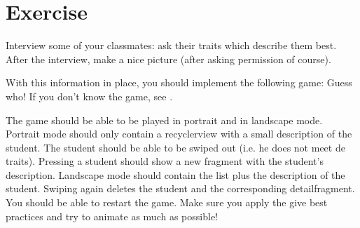 \section{Exercise}
\begin{exercise}
	Interview some of your classmates: ask their traits which describe them best. After the interview, make a nice picture (after asking permission of course).
	
	With this information in place, you should implement the following game: Guess who! If you don't know the game, see \cite{WikiHow2017}.
	
	The game should be able to be played in portrait and in landscape mode.
	Portrait mode should only contain a recyclerview with a small description of the student. The student should be able to be swiped out (i.e. he does not meet de traits). Pressing a student should show a new fragment with the student's description.
	Landscape mode should contain the list plus the description of the student. Swiping again deletes the student and the corresponding detailfragment.
	You should be able to restart the game.
	Make sure you apply the give best practices and try to animate as much as possible!
\end{exercise}

